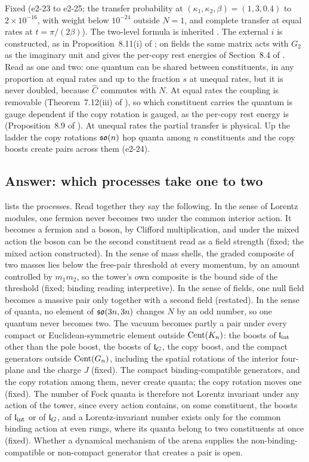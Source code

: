 Fixed (e2-23 to e2-25; the transfer probability at $(\kappa_1,\kappa_2,\beta)=(1,3,0.4)$ to $2\times10^{-16}$, with weight below $10^{-24}$
outside $N=1$, and complete transfer at equal rates at $t=\pi/(2\beta)$). The two-level formula is inherited \cite{Rabi37}. The external $i$ is
constructed, as in Proposition~8.11(i) of \cite{RE}; on fields the same matrix acts with $G_2$ as the imaginary unit and gives the per-copy
rest energies of Section~8.4 of \cite{RE}. Read as one and two: one quantum can be shared between constituents, in any proportion at equal
rates and up to the fraction $s$ at unequal rates, but it is never doubled, because $\hat C$ commutes with $N$. At equal rates the
coupling is removable (Theorem~7.12(iii) of \cite{RE}), so which constituent carries the quantum is gauge dependent if the copy rotation is
gauged, as the per-copy rest energy is (Proposition~8.9 of \cite{RE}). At unequal rates the partial transfer is physical. Up the ladder the
copy rotations $\mathfrak{so}(n)$ hop quanta among $n$ constituents and the copy boosts create pairs across them (e2-24).

\subsection{Answer: which processes take one to two}
\label{e2:sec:answer}

 lists the processes. Read together they say the following.
In the sense of Lorentz modules, one fermion never becomes two under the common interior action. It becomes a fermion and a boson, by Clifford
multiplication, and under the mixed action the boson can be the second constituent read as a field strength (fixed; the mixed action
constructed). In the sense of mass shells, the graded composite of two masses lies below the free-pair threshold at every momentum, by an
amount controlled by $m_1m_2$, so the tower's own composite is the bound side of the threshold (fixed; binding reading interpretive). In the
sense of fields, one null field becomes a massive pair only together with a second field (restated). In the sense of quanta, no element of
$\mathfrak{so}(3n,3n)$ changes $N$ by an odd number, so one quantum never becomes two. The vacuum becomes partly a pair under every compact or
Euclidean-symmetric element outside $\operatorname{Cent}(K_n)$: the boosts of $\mathfrak l_{\rm int}$ other than the pole boost, the boosts of $\mathfrak l_G$, the copy boost, and the
compact generators outside $\operatorname{Cent}(G_n)$, including the spatial rotations of the interior four-plane and the charge $J$ (fixed). The compact binding-compatible generators, and the copy rotation among them, never create quanta; the copy rotation
moves one (fixed). The number of Fock quanta is therefore not Lorentz invariant under any action of the tower, since every action
contains, on some constituent, the boosts of $\mathfrak l_{\rm int}$ or of $\mathfrak l_G$, and a Lorentz-invariant
number exists only for the common binding action at even rungs, where its quanta belong to two constituents at once (fixed). Whether a
dynamical mechanism of the arena supplies the non-binding-compatible or non-compact generator that creates a pair is open.

